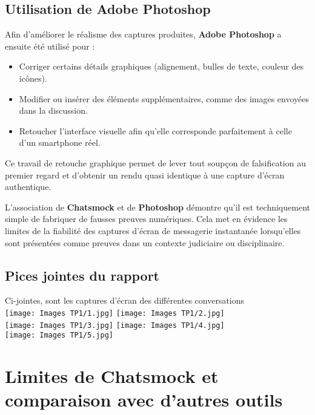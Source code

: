 \documentclass[12pt, a4paper]{article}
\begin{document}
\subsection{Utilisation de Adobe Photoshop}
Afin d’améliorer le réalisme des captures produites, \textbf{Adobe Photoshop} a ensuite été utilisé pour :  
\begin{itemize}
	\item Corriger certains détails graphiques (alignement, bulles de texte, couleur des icônes).  
	\item Modifier ou insérer des éléments supplémentaires, comme des images envoyées dans la discussion.  
	\item Retoucher l’interface visuelle afin qu’elle corresponde parfaitement à celle d’un smartphone réel.  
\end{itemize}
Ce travail de retouche graphique permet de lever tout soupçon de falsification au premier regard et d’obtenir un rendu quasi identique à une capture d’écran authentique.  

L’association de \textbf{Chatsmock} et de \textbf{Photoshop} démontre qu’il est techniquement simple de fabriquer de fausses preuves numériques. Cela met en évidence les limites de la fiabilité des captures d’écran de messagerie instantanée lorsqu’elles sont présentées comme preuves dans un contexte judiciaire ou disciplinaire.  
\subsection{Pices jointes du rapport}
Ci-jointes, sont les captures d'écran des différentes conversations\\
\texttt{[image: Images TP1/1.jpg]}
\texttt{[image: Images TP1/2.jpg]}\\
\texttt{[image: Images TP1/3.jpg]}
\texttt{[image: Images TP1/4.jpg]}\\
\texttt{[image: Images TP1/5.jpg]}
\section{Limites de Chatsmock et comparaison avec d’autres outils}
\end{document}
